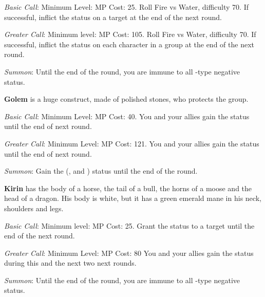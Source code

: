 \begin{multicols}{2}
    \textit{Basic Call}: Minimum Level:  MP Cost: 25. Roll Fire vs Water, difficulty 70. If successful, inflict the  status on a target at the end of the next round.
    
    \textit{Greater Call}: Minimum level:  MP Cost: 105. Roll Fire vs Water, difficulty 70. If successful, inflict the  status on each character in a group at the end of the next round.
    
    \textit{Summon}: Until the end of the round, you are immune to all -type negative status.

    \ffcrystal[type=level,height=8pt]
    
    \textbf{Golem} is a huge construct, made of polished stones, who protects the group.
    
    \textit{Basic Call}: Minimum Level:  MP Cost: 40. You and your allies gain the  status until the end of next round.
    
    \textit{Greater Call}: Minimum Level:  MP Cost: 121. You and your allies gain the  status until the end of next round.
    
    \textit{Summon}: Gain the  (,  and ) status until the end of the round.

    \ffcrystal[type=level,height=8pt]
    
    \textbf{Kirin} has the body of a horse, the tail of a bull, the horns of a moose and the head of a dragon. His body is white, but it has a green emerald mane in his neck, shoulders and legs.
    
    \textit{Basic Call}: Minimum level:  MP Cost: 25. Grant the  status to a target until the end of the next round.
    
    \textit{Greater Call}: Minimum Level:  MP Cost: 80 You and your allies gain the  status during this and the next two next rounds.
    
    \textit{Summon}: Until the end of the round, you are immune to all -type negative status.

    \ffcrystal[type=level,height=8pt]
    

\end{multicols}
